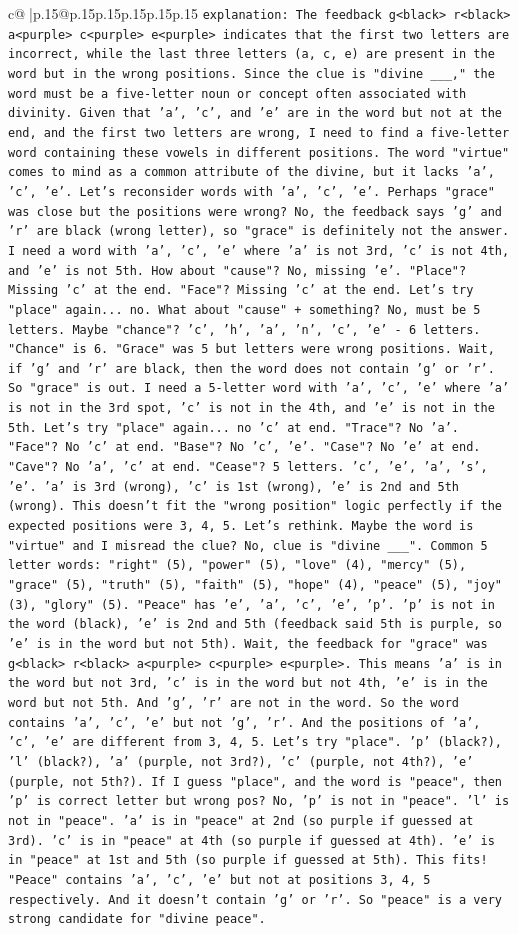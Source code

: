 \documentclass{article}
\begin{document}
{\begin{supertabular}{c@{$\;$}|p{.15\linewidth}@{}p{.15\linewidth}p{.15\linewidth}p{.15\linewidth}p{.15\linewidth}p{.15\linewidth}}
{{{                \texttt{explanation: The feedback g<black> r<black> a<purple> c<purple> e<purple> indicates that the first two letters are incorrect, while the last three letters (a, c, e) are present in the word but in the wrong positions. Since the clue is "divine \_\_\_," the word must be a five{-}letter noun or concept often associated with divinity. Given that 'a', 'c', and 'e' are in the word but not at the end, and the first two letters are wrong, I need to find a five{-}letter word containing these vowels in different positions. The word "virtue" comes to mind as a common attribute of the divine, but it lacks 'a', 'c', 'e'. Let's reconsider words with 'a', 'c', 'e'. Perhaps "grace" was close but the positions were wrong? No, the feedback says 'g' and 'r' are black (wrong letter), so "grace" is definitely not the answer. I need a word with 'a', 'c', 'e' where 'a' is not 3rd, 'c' is not 4th, and 'e' is not 5th. How about "cause"? No, missing 'e'. "Place"? Missing 'c' at the end. "Face"? Missing 'c' at the end. Let's try "place" again... no. What about "cause" + something? No, must be 5 letters. Maybe "chance"? 'c', 'h', 'a', 'n', 'c', 'e' {-} 6 letters. "Chance" is 6. "Grace" was 5 but letters were wrong positions. Wait, if 'g' and 'r' are black, then the word does not contain 'g' or 'r'. So "grace" is out. I need a 5{-}letter word with 'a', 'c', 'e' where 'a' is not in the 3rd spot, 'c' is not in the 4th, and 'e' is not in the 5th. Let's try "place" again... no 'c' at end. "Trace"? No 'a'. "Face"? No 'c' at end. "Base"? No 'c', 'e'. "Case"? No 'e' at end. "Cave"? No 'a', 'c' at end. "Cease"? 5 letters. 'c', 'e', 'a', 's', 'e'. 'a' is 3rd (wrong), 'c' is 1st (wrong), 'e' is 2nd and 5th (wrong). This doesn't fit the "wrong position" logic perfectly if the expected positions were 3, 4, 5. Let's rethink. Maybe the word is "virtue" and I misread the clue? No, clue is "divine \_\_\_". Common 5 letter words: "right" (5), "power" (5), "love" (4), "mercy" (5), "grace" (5), "truth" (5), "faith" (5), "hope" (4), "peace" (5), "joy" (3), "glory" (5). "Peace" has 'e', 'a', 'c', 'e', 'p'. 'p' is not in the word (black), 'e' is 2nd and 5th (feedback said 5th is purple, so 'e' is in the word but not 5th). Wait, the feedback for "grace" was g<black> r<black> a<purple> c<purple> e<purple>. This means 'a' is in the word but not 3rd, 'c' is in the word but not 4th, 'e' is in the word but not 5th. And 'g', 'r' are not in the word. So the word contains 'a', 'c', 'e' but not 'g', 'r'. And the positions of 'a', 'c', 'e' are different from 3, 4, 5. Let's try "place". 'p' (black?), 'l' (black?), 'a' (purple, not 3rd?), 'c' (purple, not 4th?), 'e' (purple, not 5th?). If I guess "place", and the word is "peace", then 'p' is correct letter but wrong pos? No, 'p' is not in "peace". 'l' is not in "peace". 'a' is in "peace" at 2nd (so purple if guessed at 3rd). 'c' is in "peace" at 4th (so purple if guessed at 4th). 'e' is in "peace" at 1st and 5th (so purple if guessed at 5th). This fits! "Peace" contains 'a', 'c', 'e' but not at positions 3, 4, 5 respectively. And it doesn't contain 'g' or 'r'. So "peace" is a very strong candidate for "divine peace".} \\
}}}
\end{supertabular}}
\end{document}
